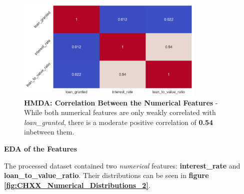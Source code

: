 \begin{figure}[!htbp]
    \centering
    \includegraphics[width=0.8\textwidth]{images/CHXX_Target_Correlation_Numerical.png}
    \caption[HMDA: Correlation Between the Numerical Features]{\textbf{HMDA: Correlation Between the Numerical Features} - While both numerical features are only weakly correlated with \textit{loan\_granted}, there is a moderate positive correlation of \textbf{0.54} inbetween them.}
    \label{fig:CHXX_Target_Correlation_Numerical}
\end{figure}


\textbf{EDA of the Features}

The processed dataset contained two \textit{numerical} features: \textbf{interest\_rate} and \textbf{loan\_to\_value\_ratio}.
Their distributions can be seen in \textbf{figure \ref{fig:CHXX_Numerical_Distributions_2}}.


